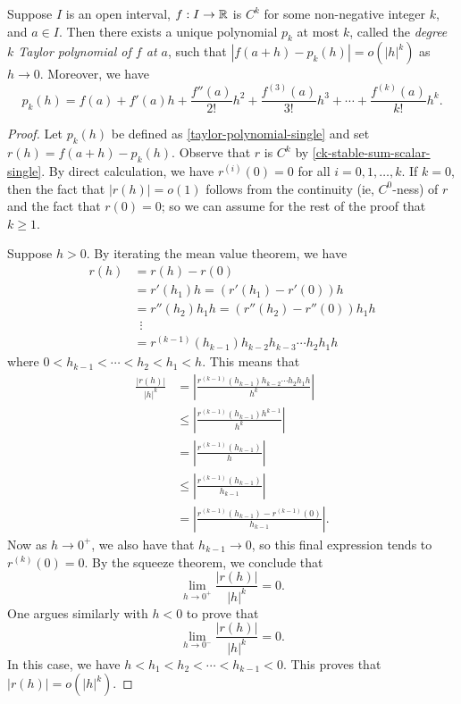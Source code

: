 \begin{theorem}[Taylor] \label{taylor-single}
	Suppose $I$ is an open interval, $f : I \to \mathbb{R}$ is $C^k$ for some non-negative integer $k$, and $a \in I$. Then there exists a unique polynomial $p_k$ at most $k$, called the \emph{degree $k$ Taylor polynomial of $f$ at $a$}, such that $|f(a+h) - p_k(h)| = o(|h|^k)$ as $h \to 0$. Moreover, we have
	\begin{equation} \label{taylor-polynomial-single} p_k(h) = f(a) + f'(a)h + \frac{f''(a)}{2!}h^2 + \frac{f^{(3)}(a)}{3!} h^3 + \dotsb + \frac{f^{(k)}(a)}{k!} h^k. \end{equation}
\end{theorem}

\begin{proof}
	Let $p_k(h)$ be defined as \cref{taylor-polynomial-single} and set $r(h) = f(a+h) - p_k(h)$. Observe that $r$ is $C^k$ by \cref{ck-stable-sum-scalar-single}. By direct calculation, we have $r^{(i)}(0) = 0$ for all $i = 0, 1, \dotsc, k$. If $k = 0$, then the fact that $|r(h)| = o(1)$ follows from the continuity (ie, $C^0$-ness) of $r$ and the fact that $r(0) = 0$; so we can assume for the rest of the proof that $k \geq 1$. 
	
	Suppose $h > 0$. By iterating the mean value theorem, we have
	\[ \begin{aligned} r(h) &= r(h) - r(0) \\
	&= r'(h_1)h = (r'(h_1) - r'(0))h \\
	&= r''(h_2)h_1 h = (r''(h_2) - r''(0))h_1 h \\
	&\enspace\vdots\\
	&= r^{(k-1)}(h_{k-1}) h_{k-2} h_{k-3} \dotsb h_2 h_1 h \end{aligned} \]
	where $0 < h_{k-1} < \dotsb < h_2 < h_1 < h$. This means that
	\[ \begin{aligned} \frac{|r(h)|}{|h|^k} &= \left| \frac{r^{(k-1)}(h_{k-1}) h_{k-2} \dotsb h_2 h_1 h}{h^k} \right| \\
	&\leq \left| \frac{r^{(k-1)}(h_{k-1}) h^{k-1}}{h^k} \right| \\
	&= \left| \frac{r^{(k-1)}(h_{k-1})}{h} \right| \\
	&\leq \left| \frac{r^{(k-1)}(h_{k-1})}{h_{k-1}} \right| \\
	&= \left| \frac{r^{(k-1)}(h_{k-1}) - r^{(k-1)}(0)}{h_{k-1}} \right|. \end{aligned}  \]
	Now as $h \to 0^+$, we also have that $h_{k-1} \to 0$, so this final expression tends to $r^{(k)}(0) = 0$. By the squeeze theorem, we conclude that 
	\[ \lim_{h \to 0^+} \frac{|r(h)|}{|h|^k} = 0. \]
	One argues similarly with $h < 0$ to prove that
	\[ \lim_{h \to 0^-} \frac{|r(h)|}{|h|^k} = 0. \]
	In this case, we have $h < h_1 < h_2 < \dotsb < h_{k-1} < 0$. This proves that $|r(h)| = o(|h|^k)$.
	

\end{proof}
